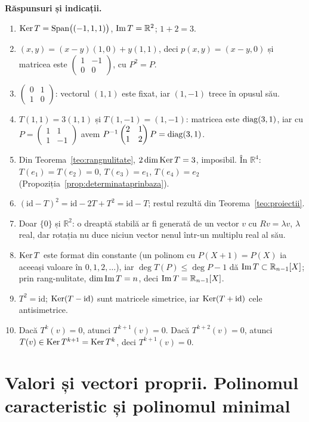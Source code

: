 \medskip\noindent\textbf{Răspunsuri și indicații.}
\begin{enumerate}[label=\textbf{\arabic*.},leftmargin=*]
\item $\operatorname{Ker} T=\operatorname{Span}\bigl((-1,1,1)\bigr)$, $\operatorname{Im} T=\mathbb{R}^2$; $1+2=3$.
\item $(x,y)=(x-y)(1,0)+y(1,1)$, deci $p(x,y)=(x-y,0)$ și matricea este $\begin{pmatrix}1&-1\\0&0\end{pmatrix}$, cu $P^2=P$.
\item $\begin{pmatrix}0&1\\1&0\end{pmatrix}$: vectorul $(1,1)$ este fixat, iar $(1,-1)$ trece în opusul său.
\item $T(1,1)=3(1,1)$ și $T(1,-1)=(1,-1)$: matricea este $\operatorname{diag}(3,1)$, iar cu $P=\begin{pmatrix}1&1\\1&-1\end{pmatrix}$ avem $P^{-1}\begin{pmatrix}2&1\\1&2\end{pmatrix}P=\operatorname{diag}(3,1)$.
\item Din Teorema~\ref{teo:rangnulitate}, $2\dim\operatorname{Ker} T=3$, imposibil. În $\mathbb{R}^4$: $T(e_1)=T(e_2)=0$, $T(e_3)=e_1$, $T(e_4)=e_2$ (Propoziția~\ref{prop:determinataprinbaza}).
\item $(\mathrm{id}-T)^2=\mathrm{id}-2T+T^2=\mathrm{id}-T$; restul rezultă din Teorema~\ref{teo:proiectii}.
\item Doar $\{0\}$ și $\mathbb{R}^2$: o dreaptă stabilă ar fi generată de un vector $v$ cu $Rv=\lambda v$, $\lambda$ real, dar rotația nu duce niciun vector nenul într-un multiplu real al său.
\item $\operatorname{Ker} T$ este format din constante (un polinom cu $P(X+1)=P(X)$ ia aceeași valoare în $0,1,2,\dots$), iar $\deg T(P)\le\deg P-1$ dă $\operatorname{Im} T\subset\mathbb{R}_{n-1}[X]$; prin rang-nulitate, $\dim\operatorname{Im} T=n$, deci $\operatorname{Im} T=\mathbb{R}_{n-1}[X]$.
\item $T^2=\mathrm{id}$; $\operatorname{Ker}(T-\mathrm{id})$ sunt matricele simetrice, iar $\operatorname{Ker}(T+\mathrm{id})$ cele antisimetrice.
\item Dacă $T^k(v)=0$, atunci $T^{k+1}(v)=0$. Dacă $T^{k+2}(v)=0$, atunci $T(v)\in\operatorname{Ker} T^{k+1}=\operatorname{Ker} T^k$, deci $T^{k+1}(v)=0$.
\end{enumerate}

\chapter{Valori și vectori proprii. Polinomul caracteristic și polinomul minimal}\label{ch:valproprii}

